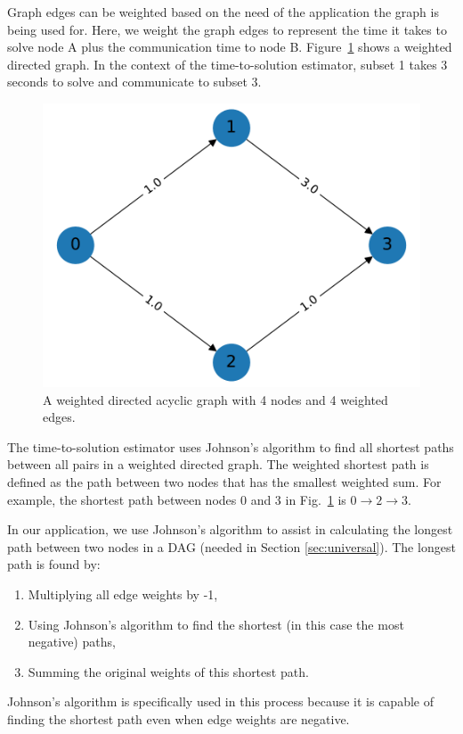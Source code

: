 Graph edges can be weighted based on the need of the application the graph is being used for. Here, we weight the graph edges to represent the time it takes to solve node A plus the communication time to node B.
Figure~\ref{weighted_directed_graph} shows a weighted directed graph.
In the context of the time-to-solution estimator, subset 1 takes 3 seconds to solve and communicate to subset 3.
\begin{figure}[H]
\centering
\includegraphics[scale=0.5]{../../figures/weighted_directed_graph.pdf}
\caption{A weighted directed acyclic graph with 4 nodes and 4 weighted edges.}
\label{weighted_directed_graph}
\end{figure}

The time-to-solution estimator uses Johnson's algorithm \cite{intro_to_alg,johnson_nist,johnson_johnson} to find all shortest paths between all pairs in a weighted directed graph.
The weighted shortest path is defined as the path between two nodes that has the smallest weighted sum.
For example, the shortest path between nodes 0 and 3 in Fig.~\ref{weighted_directed_graph} is $0\rightarrow 2\rightarrow 3$.

In our application, we use Johnson's algorithm to assist in calculating the longest path between two nodes in a DAG (needed in Section \ref{sec:universal}).
The longest path is found by:
\begin{enumerate}
  \item Multiplying all edge weights by -1,
  \item Using Johnson's algorithm to find the shortest (in this case the most negative) paths,
  \item Summing the original weights of this shortest path.
\end{enumerate}
Johnson's algorithm is specifically used in this process because it is capable of finding the shortest path even when edge weights are negative.

